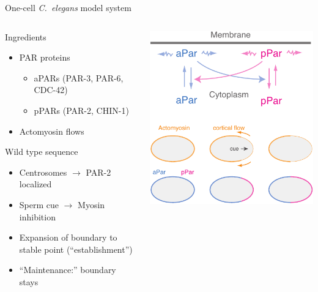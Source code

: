 \documentclass{beamer}
\newcommand{\6}[1]{#1_{\text{6}}}
\newcommand{\3}[1]{#1_{\text{3}}}
\begin{document}
\begin{frame}{One-cell \emph{C.\ elegans} model system}
\begin{columns}
\begin{column}{0.6\textwidth}
Ingredients
\begin{itemize}
\item PAR proteins 
\begin{itemize}
\item aPARs (PAR-3, PAR-6, CDC-42)
\item pPARs (PAR-2, CHIN-1)
\end{itemize}
\item Actomyosin flows 
\end{itemize}

\pause
Wild type sequence
\begin{itemize}
\item Centrosomes $\rightarrow$ PAR-2 localized
\item Sperm cue $\rightarrow$ Myosin inhibition
\item Expansion of boundary to stable point (``establishment'')
\item ``Maintenance:'' boundary stays
\end{itemize}
\end{column}

\begin{column}{0.5\textwidth}
\includegraphics[width=\textwidth]{CElegansScheme-crop.pdf}
\end{column}
\end{columns}
\end{frame}
\end{document}

